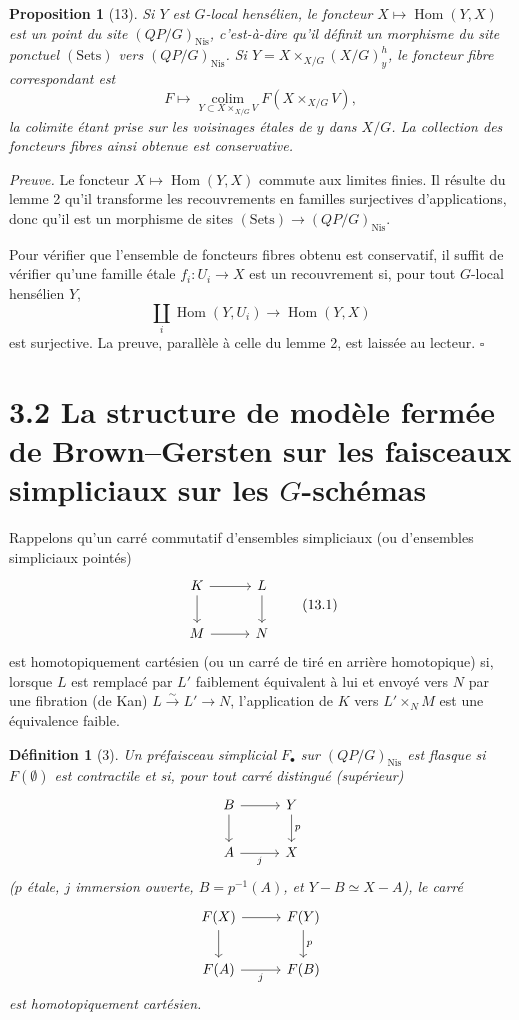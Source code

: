 \documentclass[11pt]{article}
\newcommand{\Nis}{\mathrm{Nis}}
\newcommand{\Hom}{\operatorname{Hom}}
\theoremstyle{deligne}
\newtheorem*{proposition*}{Proposition}
\newtheorem*{definition*}{Définition}
\newenvironment{proofdel}{\noindent\textit{Preuve.}}{\hfill$\square$}
\begin{document}
\begin{proposition*}[13]
Si \(Y\) est \(G\)-local hensélien, le foncteur \(X\mapsto\Hom(Y,X)\) est un point du site \((QP/G)_{\Nis}\), c'est-à-dire qu'il définit un morphisme du site ponctuel \((\mathrm{Sets})\) vers \((QP/G)_{\Nis}\). Si \(Y=X\times_{X/G}(X/G)^h_y\), le foncteur fibre correspondant est
\[
F\longmapsto \operatorname*{colim}_{Y\subset X\times_{X/G}V}F(X\times_{X/G}V),
\]
la colimite étant prise sur les voisinages étales de \(y\) dans \(X/G\). La collection des foncteurs fibres ainsi obtenue est conservative.
\end{proposition*}

\begin{proofdel}
Le foncteur \(X\mapsto\Hom(Y,X)\) commute aux limites finies. Il résulte du lemme 2 qu'il transforme les recouvrements en familles surjectives d'applications, donc qu'il est un morphisme de sites \((\mathrm{Sets})\to(QP/G)_{\Nis}\).

Pour vérifier que l'ensemble de foncteurs fibres obtenu est conservatif, il suffit de vérifier qu'une famille étale \(f_i:U_i\to X\) est un recouvrement si, pour tout \(G\)-local hensélien \(Y\),
\[
\coprod_i \Hom(Y,U_i)\longrightarrow \Hom(Y,X)
\]
est surjective. La preuve, parallèle à celle du lemme 2, est laissée au lecteur.
\end{proofdel}

\section*{3.2 La structure de modèle fermée de Brown--Gersten sur les faisceaux simpliciaux sur les \(G\)-schémas}

Rappelons qu'un carré commutatif d'ensembles simpliciaux (ou d'ensembles simpliciaux pointés)
\[
\begin{tikzcd}[column sep=2.8em,row sep=2em]
K \arrow[r] \arrow[d] & L \arrow[d]\\
M \arrow[r] & N
\end{tikzcd}
\tag{13.1}
\]
est homotopiquement cartésien (ou un carré de tiré en arrière homotopique) si, lorsque \(L\) est remplacé par \(L'\) faiblement équivalent à lui et envoyé vers \(N\) par une fibration (de Kan) \(L\overset{\sim}{\to}L'\to N\), l'application de \(K\) vers \(L'\times_NM\) est une équivalence faible.

\begin{definition*}[3]
Un préfaisceau simplicial \(F_\bullet\) sur \((QP/G)_{\Nis}\) est flasque si \(F(\emptyset)\) est contractile et si, pour tout carré distingué (supérieur)
\[
\begin{tikzcd}[column sep=2.8em,row sep=2em]
B \arrow[r] \arrow[d] & Y \arrow[d,"p"]\\
A \arrow[r,"j"'] & X
\end{tikzcd}
\]
(\(p\) étale, \(j\) immersion ouverte, \(B=p^{-1}(A)\), et \(Y-B\simeq X-A\)), le carré
\[
\begin{tikzcd}[column sep=2.8em,row sep=2em]
F(X) \arrow[r] \arrow[d] & F(Y) \arrow[d,"p"]\\
F(A) \arrow[r,"j"'] & F(B)
\end{tikzcd}
\]
est homotopiquement cartésien.
\end{definition*}
\end{document}
